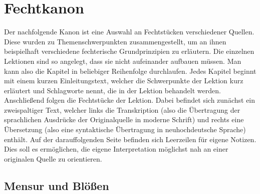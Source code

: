 \section{Fechtkanon}

Der nachfolgende Kanon ist eine Auswahl an Fechtstücken verschiedener Quellen.
Diese wurden zu Themenschwerpunkten zusammengestellt, um an ihnen beispielhaft verschiedene fechterische Grundprinzipien zu erläutern.
Die einzelnen Lektionen sind so angelegt, dass sie nicht aufeinander aufbauen müssen.
Man kann also die Kapitel in beliebiger Reihenfolge durchlaufen.
Jedes Kapitel beginnt mit einem kurzen Einleitungstext, welcher die Schwerpunkte der Lektion kurz erläutert und Schlagworte nennt, die in der Lektion behandelt werden.
Anschließend folgen die Fechtstücke der Lektion.
Dabei befindet sich zunächst ein zweispaltiger Text, welcher links die Transkription (also die Übertragung der sprachlichen Ausdrücke der Originalquelle in moderne Schrift) und rechts eine Übersetzung (also eine syntaktische Übertragung in neuhochdeutsche Sprache) enthält.
Auf der darauffolgenden Seite befinden sich Leerzeilen für eigene Notizen.
Dies soll es ermöglichen, die eigene Interpretation möglichst nah an einer originalen Quelle zu orientieren.

\newpage

\subsection{Mensur und Blößen}

